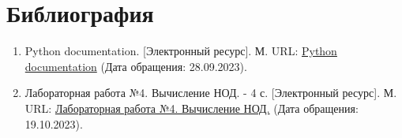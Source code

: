 \documentclass[
  12pt,
  a4paper,
]{scrreprt}
\begin{document}
\chapter{Библиография}\label{ux431ux438ux431ux43bux438ux43eux433ux440ux430ux444ux438ux44f}

\begin{enumerate}
\def\labelenumi{\arabic{enumi}.}
\item
  Python documentation. {[}Электронный ресурс{]}. М. URL:
  \href{https://docs.python.org/3/index.html}{Python documentation}
  (Дата обращения: 28.09.2023).
\item
  Лабораторная работа №4. Вычисление НОД. - 4 с. {[}Электронный
  ресурс{]}. М. URL:
  \href{https://esystem.rudn.ru/pluginfile.php/2089804/mod_folder/content/0/lab04.pdf}{Лабораторная
  работа №4. Вычисление НОД.} (Дата обращения: 19.10.2023).
\end{enumerate}

\printbibliography
\end{document}
